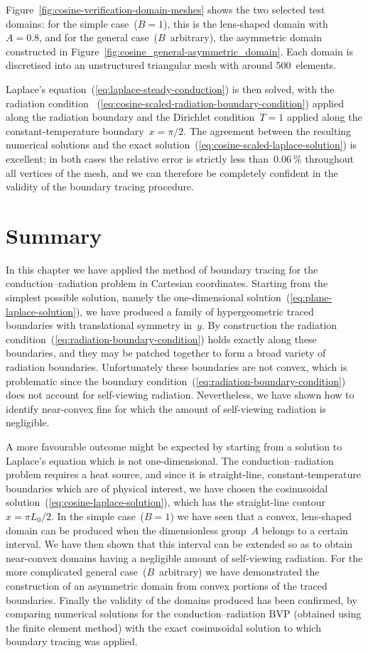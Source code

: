 Figure~\ref{fig:cosine-verification-domain-meshes}
shows the two selected test domains:
for the simple case~($B = 1$),
this is the lens-shaped domain with~$A = 0.8$,
and for the general case~($B$~arbitrary),
the asymmetric domain constructed
in Figure~\ref{fig:cosine_general-asymmetric_domain}.
Each domain is discretised into an unstructured triangular mesh
with around 500~elements.

Laplace's equation~(\ref{eq:laplace-steady-conduction}) is then solved,
with the radiation condition~%
  (\ref{eq:cosine-scaled-radiation-boundary-condition})
applied along the radiation boundary
and the Dirichlet condition~$T = 1$ applied
along the constant-temperature boundary~$x = \pi/2$.
The agreement between the resulting numerical solutions
and the exact solution~(\ref{eq:cosine-scaled-laplace-solution})
is excellent;
in both cases the relative error is strictly less than~$\SI{0.06}{\percent}$
throughout all vertices of the mesh,
and we can therefore be completely confident
in the validity of the boundary tracing procedure.

\section{Summary}
\label{sec:cartesian.summary}

In this chapter we have applied the method of boundary tracing
for the conduction--radiation problem in Cartesian coordinates.
Starting from the simplest possible solution,
namely the one-dimensional solution~(\ref{eq:plane-laplace-solution}),
we have produced
a family of hypergeometric traced boundaries
with translational symmetry in~$y$.
By construction
the radiation condition~(\ref{eq:radiation-boundary-condition})
holds exactly along these boundaries,
and they may be patched together
to form a broad variety of radiation boundaries.
Unfortunately these boundaries are not convex,
which is problematic
since the boundary condition~(\ref{eq:radiation-boundary-condition})
does not account for self-viewing radiation.
Nevertheless, we have shown how to identify near-convex fins
for which the amount of self-viewing radiation is negligible.

A more favourable outcome might be expected
by starting from a solution to Laplace's equation
which is not one-dimensional.
The conduction--radiation problem requires a heat source,
and since it is straight-line, constant-temperature boundaries
which are of physical interest,
we have chosen the cosinusoidal solution~(\ref{eq:cosine-laplace-solution}),
which has the straight-line contour~$x = \pi L_0/2$.
In the simple case~($B = 1$)
we have seen that a convex, lens-shaped domain can be produced
when the dimensionless group~$A$ belongs to a certain interval.
We have then shown that this interval can be extended
so as to obtain near-convex domains
having a negligible amount of self-viewing radiation.
For the more complicated general case~($B$~arbitrary)
we have demonstrated the construction of an asymmetric domain
from convex portions of the traced boundaries.
Finally the validity of the domains produced has been confirmed,
by comparing numerical solutions for the conduction--radiation BVP
(obtained using the finite element method)
with the exact cosinusoidal solution
to which boundary tracing was applied.
